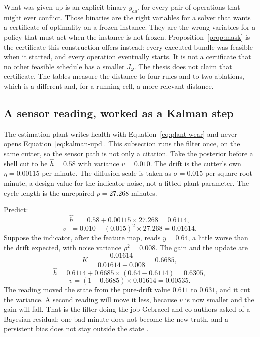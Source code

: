 What was given up is an explicit binary \(y_{aa'}\) for every pair of operations that might ever conflict. Those binaries are the right variables for a solver that wants a certificate of optimality on a frozen instance. They are the wrong variables for a policy that must act when the instance is not frozen. Proposition~\ref{prop:mask} is the certificate this construction offers instead: every executed bundle was feasible when it started, and every operation eventually starts. It is not a certificate that no other feasible schedule has a smaller \(J_\omega\). The thesis does not claim that certificate. The tables measure the distance to four rules and to two ablations, which is a different and, for a running cell, a more relevant distance.

\subsection{A sensor reading, worked as a Kalman step}

The estimation plant writes health with Equation~\eqref{eq:plant-wear} and never opens Equation~\eqref{eq:kalman-upd}. This subsection runs the filter once, on the same cutter, so the sensor path is not only a citation. Take the posterior before a shell cut to be \(\hat h = 0.58\) with variance \(v = 0.010\). The drift is the cutter's own \(\eta = 0.00115\) per minute. The diffusion scale is taken as \(\sigma = 0.015\) per square-root minute, a design value for the indicator noise, not a fitted plant parameter. The cycle length is the unrepaired \(p = 27.268\) minutes.

Predict:
\begin{equation}
\hat h^{-} = 0.58 + 0.00115 \times 27.268 = 0.6114 ,
\end{equation}
\begin{equation}
v^{-} = 0.010 + (0.015)^2 \times 27.268 = 0.01614 .
\end{equation}
Suppose the indicator, after the feature map, reads \(y = 0.64\), a little worse than the drift expected, with noise variance \(\rho^2 = 0.008\). The gain and the update are
\begin{equation}
K = \frac{0.01614}{0.01614 + 0.008} = 0.6685 ,
\end{equation}
\begin{equation}
\hat h = 0.6114 + 0.6685 \times (0.64 - 0.6114) = 0.6305 ,
\end{equation}
\begin{equation}
v = (1 - 0.6685) \times 0.01614 = 0.00535 .
\end{equation}
The reading moved the state from the pure-drift value \(0.611\) to \(0.631\), and it cut the variance. A second reading will move it less, because \(v\) is now smaller and the gain will fall. That is the filter doing the job Gebraeel and co-authors asked of a Bayesian residual: one bad minute does not become the new truth, and a persistent bias does not stay outside the state \cite{gebraeel2005}.

